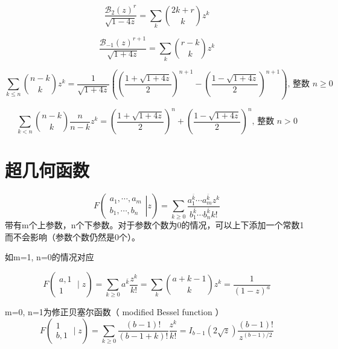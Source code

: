 \begin{equation}
    \frac{\mathcal{B}_{2}(z)^{r}}{\sqrt{1-4 z}}=\sum_{k}{2 k+r \choose k} z^{k}
\end{equation}

\begin{equation}
    \frac{\mathcal{B}_{-1}(z)^{r+1}}{\sqrt{1+4 z}}=\sum_{k}{r-k \choose k} z^{k}
\end{equation}

\begin{equation}
    \sum_{k \leqslant n}{n-k \choose k} z^{k}=\frac{1}{\sqrt{1+4 z}}\left(\left(\frac{1+\sqrt{1+4 z}}{2}\right)^{n+1}-\left(\frac{1-\sqrt{1+4 z}}{2}\right)^{n+1}\right) \text {, 整数 } n \geqslant 0
\end{equation}

\begin{equation}
    \sum_{k<n}{n-k \choose k} \frac{n}{n-k} z^{k}=\left(\frac{1+\sqrt{1+4 z}}{2}\right)^{n}+\left(\frac{1-\sqrt{1+4 z}}{2}\right)^{n} \text {, 整数 } n>0
\end{equation}

\section{超几何函数}

\setcounter{equation}{75}
\begin{equation}
    F\left(\left.\begin{array}{c}
    a_{1}, \cdots, a_{m} \\
    b_{1}, \cdots, b_{n}
    \end{array}\right| z\right)=\sum_{k \geqslant 0} \frac{a_{1}^{\bar{k}} \cdots a_{m}^{\bar{k}} z^{k}}{b_{1}^{\bar{k}} \cdots b_{n}^{\bar{k}} k !}
\end{equation}
带有m个上参数，n个下参数。对于参数个数为0的情况，可以上下添加一个常数1而不会影响（参数个数仍然是0个）。

如m=1, n=0的情况对应

\begin{equation}
    F\left(\begin{array}{c}
    a, 1 \\
    1
    \end{array} \mid z\right)=\sum_{k \geqslant 0} a^{\bar{k}} \frac{z^{k}}{k !}=\sum_{k}{a+k-1 \choose k} z^{k}=\frac{1}{(1-z)^{a}}
\end{equation}

m=0, n=1为修正贝塞尔函数（ modified Bessel function ）
\begin{equation}
    F\left(\begin{array}{c}
    1 \\
    b, 1
    \end{array} \mid z\right)=\sum_{k \geqslant 0} \frac{(b-1) !}{(b-1+k) !} \frac{z^{k}}{k !}=I_{b-1}(2 \sqrt{z}) \frac{(b-1) !}{z^{(b-1) / 2}}
\end{equation}

